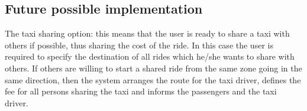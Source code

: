 	\subsection{Future possible implementation}
		The taxi sharing option: this means that the user is ready to 
		share a taxi with others if possible, thus sharing the cost of the ride. In this case 
		the user is required to specify the destination of all rides which he/she wants to 
		share with others. If others are willing to start a shared ride from the same zone 
		going in the same direction, then the system arranges the route for the taxi 
		driver, defines the fee for all persons sharing the taxi and informs the passengers 
		and the taxi driver.